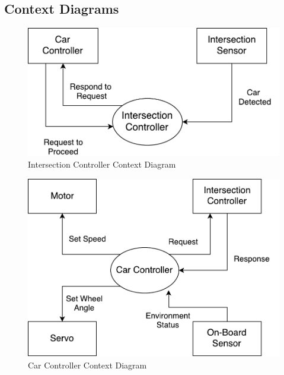 \documentclass [10pt]{article}
\begin{document}
    
    
    
\subsection{Context Diagrams}
\begin{figure} [h!]
	\caption{Intersection Controller Context Diagram} \bigskip
	\centering
	\includegraphics [scale = 0.8] {figures/IC_ContextDiagram.pdf}

\end{figure}
\pagebreak
\begin{figure} [h!]
	\caption{Car Controller Context Diagram} \bigskip
	\centering
	\includegraphics [scale =0.8] {figures/CarCtrl_ContextDiag.pdf}

\end{figure}
\end{document}
